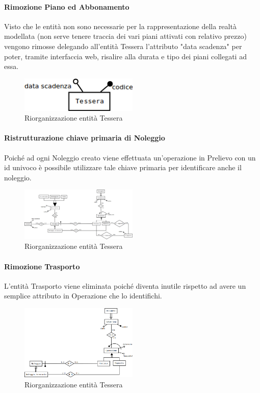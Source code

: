 \documentclass[a4paper,twoside]{article}
\begin{document}
\paragraph{Rimozione Piano ed Abbonamento}
Visto che le entità non sono necessarie per la rappresentazione della realtà modellata (non serve tenere traccia dei vari piani attivati con relativo prezzo) vengono rimosse delegando all'entità Tessera l'attributo "data scadenza" per poter, tramite interfaccia web, risalire alla durata e tipo dei piani collegati ad essa. \newline
\begin{figure}[H]
	\centering
	\includegraphics[width=0.5\textwidth]{Immagini-Grafici/Logico02.png}
	\caption{Riorganizzazione entità Tessera}
\end{figure}

\paragraph{Ristrutturazione chiave primaria di Noleggio}
Poiché ad ogni Noleggio creato viene effettuata un'operazione in Prelievo con un id univoco è possibile utilizzare tale chiave primaria per identificare anche il noleggio. \newline
\begin{figure}[H]
	\centering
	\includegraphics[width=0.5\textwidth]{Immagini-Grafici/Logico03.png}
	\caption{Riorganizzazione entità Tessera}
\end{figure}

\paragraph{Rimozione Trasporto}
L'entità Trasporto viene eliminata poiché diventa inutile rispetto ad avere un semplice attributo in Operazione che lo identifichi. \newline
\begin{figure}[H]
	\centering
	\includegraphics[width=0.5\textwidth]{Immagini-Grafici/Logico04.png}
	\caption{Riorganizzazione entità Tessera}
\end{figure}
\end{document}
